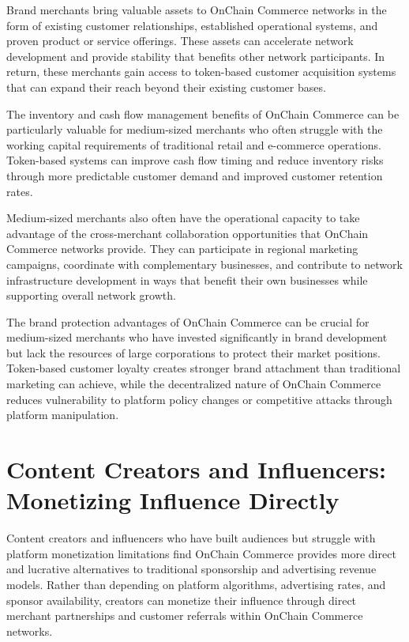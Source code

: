 \documentclass[
  Letterpaper,
]{scrbook}
\begin{document}
Brand merchants bring valuable assets to OnChain Commerce networks in
the form of existing customer relationships, established operational
systems, and proven product or service offerings. These assets can
accelerate network development and provide stability that benefits other
network participants. In return, these merchants gain access to
token-based customer acquisition systems that can expand their reach
beyond their existing customer bases.

The inventory and cash flow management benefits of OnChain Commerce can
be particularly valuable for medium-sized merchants who often struggle
with the working capital requirements of traditional retail and
e-commerce operations. Token-based systems can improve cash flow timing
and reduce inventory risks through more predictable customer demand and
improved customer retention rates.

Medium-sized merchants also often have the operational capacity to take
advantage of the cross-merchant collaboration opportunities that OnChain
Commerce networks provide. They can participate in regional marketing
campaigns, coordinate with complementary businesses, and contribute to
network infrastructure development in ways that benefit their own
businesses while supporting overall network growth.

The brand protection advantages of OnChain Commerce can be crucial for
medium-sized merchants who have invested significantly in brand
development but lack the resources of large corporations to protect
their market positions. Token-based customer loyalty creates stronger
brand attachment than traditional marketing can achieve, while the
decentralized nature of OnChain Commerce reduces vulnerability to
platform policy changes or competitive attacks through platform
manipulation.

\section{Content Creators and Influencers: Monetizing Influence
Directly}\label{content-creators-and-influencers-monetizing-influence-directly}

Content creators and influencers who have built audiences but struggle
with platform monetization limitations find OnChain Commerce provides
more direct and lucrative alternatives to traditional sponsorship and
advertising revenue models. Rather than depending on platform
algorithms, advertising rates, and sponsor availability, creators can
monetize their influence through direct merchant partnerships and
customer referrals within OnChain Commerce networks.
\end{document}
